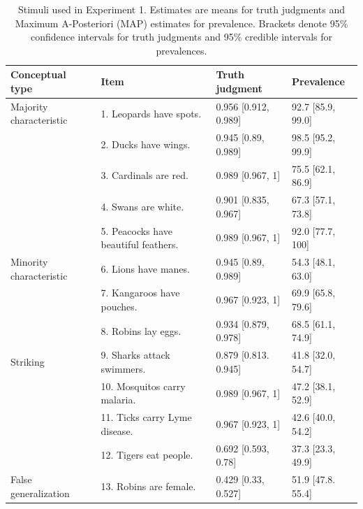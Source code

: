 \documentclass[10pt,letterpaper]{article}
\begin{document}
\begin{table}[h]
\centering

\caption{Stimuli used in Experiment 1. 
Estimates are means for truth judgments and Maximum A-Posteriori (MAP) estimates for prevalence. 
Brackets denote 95\% confidence intervals for truth judgments and 95\% credible intervals for prevalences.}
\begin{tabular}{| l | l | p{3.5cm} | p{3.5cm} |}
\hline
Conceptual type & Item & Truth judgment & Prevalence \\
\hline \hline
Majority characteristic       & 1. Leopards have spots.    &0.956	[0.912, 0.989] & 92.7 [85.9, 99.0]\\
                                          & 2. Ducks have wings.                       &0.945	[0.89, 0.989] & 98.5 [95.2, 99.9]\\
                                          & 3. Cardinals are red.                       &0.989	[0.967, 1] & 75.5 [62.1, 86.9]\\
                                          & 4. Swans are white.                       &0.901	[0.835, 0.967] & 67.3 [57.1, 73.8] \\
                                          & 5. Peacocks have beautiful feathers. &  0.989	[0.967, 1] & 92.0 [77.7, 100] \\
Minority characteristic       & 6. Lions have manes.       &0.945	[0.89, 0.989] & 54.3 [48.1, 63.0]\\
                                          & 7. Kangaroos have pouches.                        &0.967 [0.923, 1]& 69.9 [65.8, 79.6]\\
                                          & 8. Robins lay eggs.                        &0.934	[0.879, 0.978]& 68.5 [61.1, 74.9]\\
Striking                      & 9. Sharks attack swimmers. &0.879	[0.813. 0.945] & 41.8 [32.0, 54.7]\\
                                  & 10. Mosquitos carry malaria.                        &0.989	[0.967, 1] & 47.2 [38.1,	 52.9]\\
                                  & 11. Ticks carry Lyme disease.                        &0.967	[0.923, 1] &  42.6 [40.0, 54.2]\\
                                  & 12. Tigers eat people.                        &0.692	[0.593, 0.78] & 37.3 [23.3, 49.9]\\
False generalization & 13. Robins are female.      &0.429	[0.33, 0.527] & 51.9 [47.8. 55.4]\\

\end{tabular}
\end{table}
\end{document}
